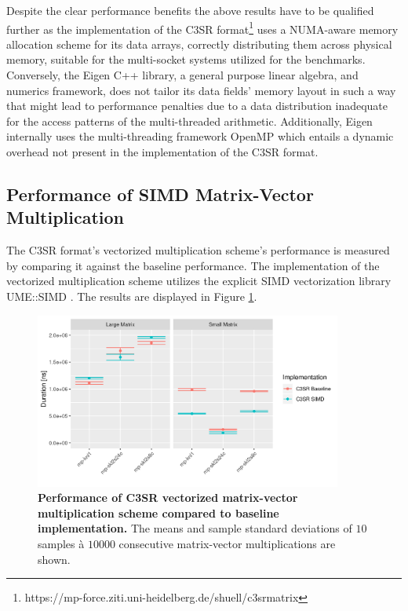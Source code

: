 \documentclass{article}
\begin{document}
    Despite the clear performance benefits the above results have to be qualified further as the implementation of the C3SR format\footnote{https://mp-force.ziti.uni-heidelberg.de/shuell/c3srmatrix} uses a NUMA-aware memory allocation scheme for its data arrays, correctly distributing them across physical memory, suitable for the multi-socket systems utilized for the benchmarks. Conversely, the Eigen C++ library, a general purpose linear algebra, and numerics framework, does not tailor its data fields' memory layout in such a way that might lead to performance penalties due to a data distribution inadequate for the access patterns of the multi-threaded arithmetic. Additionally, Eigen internally uses the multi-threading framework OpenMP \cite{openmp:website} which entails a dynamic overhead not present in the implementation of the C3SR format.

  \subsection{Performance of SIMD Matrix-Vector Multiplication}

    The C3SR format's vectorized multiplication scheme's performance is measured by comparing it against the baseline performance. The implementation of the vectorized multiplication scheme utilizes the explicit SIMD vectorization library UME::SIMD \cite{umesimd2017}. The results are displayed in Figure \ref{fig:arithmetic-performance}.

    \begin{figure}[!ht]
      \centering
      \includegraphics[width=0.9\textwidth]{assets/arithmetic_performance}
      \caption[Performance of C3SR vectorized matrix-vector multiplication scheme compared to baseline implementation.]{\textbf{Performance of C3SR vectorized matrix-vector multiplication scheme compared to baseline implementation.} The means and sample standard deviations of $10$ samples à $10000$ consecutive matrix-vector multiplications are shown.}
      \label{fig:arithmetic-performance}
    \end{figure}
\end{document}
